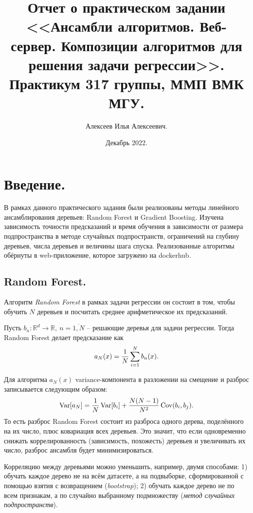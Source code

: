 \documentclass[12pt]{extarticle}
\title{Отчет о практическом задании \\ <<Ансамбли алгоритмов. Веб-сервер. Композиции алгоритмов для решения задачи регрессии>>.\\[6mm] \large Практикум 317 группы, ММП ВМК МГУ.}
\author{Алексеев Илья Алексеевич.}
\date{Декабрь 2022.}
\newcommand{\R}{\mathbb{R}}
\DeclareMathOperator{\var}{\text{Var}}
\DeclareMathOperator{\cov}{\text{Cov}}
\begin{document}
\maketitle

\tableofcontents

\newpage

\section{Введение.}

В рамках данного практического задания были реализованы методы линейного ансамблирования деревьев: Random Forest и Gradient Boosting. Изучена зависимость точности предсказаний и время обучения в зависимости от размера подпространства в методе случайных подпространств, ограничений на глубину деревьев, числа деревьев и величины шага спуска. Реализованные алгоритмы обёрнуты в web-приложение, которое загружено на dockerhub.

\subsection{Random Forest.}

Алгоритм \textit{Random Forest} \cite{lin} в рамках задачи регрессии он состоит в том, чтобы обучить $N$ деревьев и посчитать среднее арифметическое их предсказаний.

Пусть $b_n:\R^d\to\R,\ n=\overline{1,N}$ -- решающие деревья для задачи регрессии. Тогда Random Forest делает предсказание как
\begin{equation*}
    a_N(x)={1\over N}\sum_{i=1}^Nb_n(x).
\end{equation*}

Для алгоритма $a_N(x)$ variance-компонента в разложении на смещение и разброс записывается следующим образом:
\begin{equation}\label{eq:var}
    \var[a_N]={1\over N}\var[b_i]+{N(N-1)\over N^2}\cov(b_i,b_j).
\end{equation}
То есть разброс Random Forest состоит из разброса одного дерева, поделённого на их число, плюс ковариация всех деревьев. Это значит, что если одновременно снижать коррелированность (зависимость, похожесть) деревьев и увеличивать их число, разброс ансамбля будет минимизироваться.

Корреляцию между деревьями можно уменьшить, например, двумя способами: 1) обучать каждое дерево не на всём датасете, а на подвыборке, сформированной с помощью взятия с возвращением (\textit{bootstrap}); 2) обучать каждое дерево не по всем признакам, а по случайно выбранному подмножеству (\textit{метод случайных подпространств}).
\end{document}
